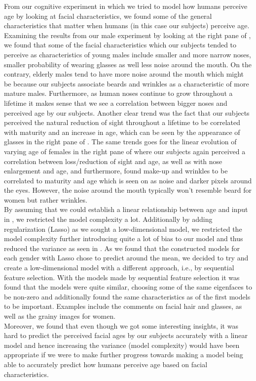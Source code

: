 From our cognitive experiment in which we tried to model how humans perceive age by looking at facial characteristics, we found some of the general characteristics that matter when humans (in this case our subjects) perceive age. Examining the results from our male experiment by looking at the right pane of , we found that some of the facial characteristics which our subjects tended to perceive as characteristics of young males include smaller and more narrow noses, smaller probability of wearing glasses as well less noise around the mouth. On the contrary, elderly males tend to have more noise around the mouth which might be because our subjects associate beards and wrinkles as a characteristic of more mature males. Furthermore, as human noses continue to grow throughout a lifetime it makes sense that we see a correlation between bigger noses and perceived age by our subjects. Another clear trend was the fact that our subjects perceived the natural reduction of sight throughout a lifetime to be correlated with maturity and an increase in age, which can be seen by the appearance of glasses in the right pane of . The same trends goes for the linear evolution of varying age of females in the right pane of  where our subjects again perceived a correlation between loss/reduction of sight and age, as well as with nose enlargement and age, and furthermore, found make-up and wrinkles to be correlated to maturity and age which is seen on  as noise and darker pixels around the eyes. However, the noise around the mouth typically won't resemble beard for women but rather wrinkles. \\ By assuming that we could establish a linear relationship between age and input in , we restricted the model complexity a lot. Additionally by adding regularization (Lasso) as we sought a low-dimensional model, we restricted the model complexity further introducing quite a lot of bias to our model and thus reduced the variance as seen in . As we found that the constructed models for each gender with Lasso chose to predict around the mean, we decided to try and create a low-dimensional model with a different approach, i.e., by sequential feature selection. With the models made by sequential feature selection it was found that the models were quite similar, choosing some of the same eigenfaces to be non-zero and additionally found the same characteristics as of the first models to be important. Examples include the comments on facial hair and glasses, as well as the grainy images for women. \\ 
Moreover, we found that even though we got some interesting insights, it was hard to predict the perceived facial ages by our subjects accurately with a linear model and hence increasing the variance (model complexity) would have been appropriate if we were to make further progress towards making a model being able to accurately predict how humans perceive age based on facial characteristics. 
